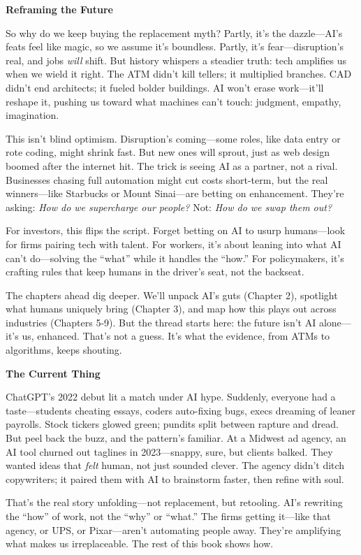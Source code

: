 \documentclass[
  Letterpaper,
]{scrbook}
\begin{document}
\textbf{Reframing the Future}

So why do we keep buying the replacement myth? Partly, it's the
dazzle---AI's feats feel like magic, so we assume it's boundless.
Partly, it's fear---disruption's real, and jobs \emph{will} shift. But
history whispers a steadier truth: tech amplifies us when we wield it
right. The ATM didn't kill tellers; it multiplied branches. CAD didn't
end architects; it fueled bolder buildings. AI won't erase work---it'll
reshape it, pushing us toward what machines can't touch: judgment,
empathy, imagination.

This isn't blind optimism. Disruption's coming---some roles, like data
entry or rote coding, might shrink fast. But new ones will sprout, just
as web design boomed after the internet hit. The trick is seeing AI as a
partner, not a rival. Businesses chasing full automation might cut costs
short-term, but the real winners---like Starbucks or Mount Sinai---are
betting on enhancement. They're asking: \emph{How do we supercharge our
people?} Not: \emph{How do we swap them out?}

For investors, this flips the script. Forget betting on AI to usurp
humans---look for firms pairing tech with talent. For workers, it's
about leaning into what AI can't do---solving the ``what'' while it
handles the ``how.'' For policymakers, it's crafting rules that keep
humans in the driver's seat, not the backseat.

The chapters ahead dig deeper. We'll unpack AI's guts (Chapter 2),
spotlight what humans uniquely bring (Chapter 3), and map how this plays
out across industries (Chapters 5-9). But the thread starts here: the
future isn't AI alone---it's us, enhanced. That's not a guess. It's what
the evidence, from ATMs to algorithms, keeps shouting.

\textbf{The Current Thing}

ChatGPT's 2022 debut lit a match under AI hype. Suddenly, everyone had a
taste---students cheating essays, coders auto-fixing bugs, execs
dreaming of leaner payrolls. Stock tickers glowed green; pundits split
between rapture and dread. But peel back the buzz, and the pattern's
familiar. At a Midwest ad agency, an AI tool churned out taglines in
2023---snappy, sure, but clients balked. They wanted ideas that
\emph{felt} human, not just sounded clever. The agency didn't ditch
copywriters; it paired them with AI to brainstorm faster, then refine
with soul.

That's the real story unfolding---not replacement, but retooling. AI's
rewriting the ``how'' of work, not the ``why'' or ``what.'' The firms
getting it---like that agency, or UPS, or Pixar---aren't automating
people away. They're amplifying what makes us irreplaceable. The rest of
this book shows how.
\end{document}
